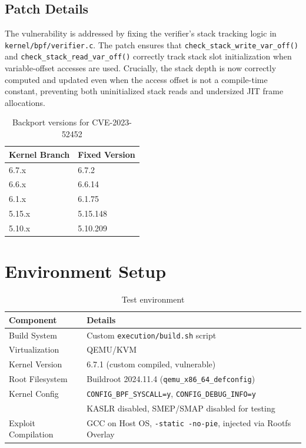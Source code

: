 \subsection{Patch Details}

The vulnerability is addressed by fixing the verifier's stack tracking logic in \texttt{kernel/bpf/verifier.c}. The patch ensures that \texttt{check\_stack\_write\_var\_off()} and \texttt{check\_stack\_read\_var\_off()} correctly track stack slot initialization when variable-offset accesses are used. Crucially, the stack depth is now correctly computed and updated even when the access offset is not a compile-time constant, preventing both uninitialized stack reads and undersized JIT frame allocations.

\begin{table}[H]
\centering
\begin{tabular}{@{}ll@{}}
\toprule
\textbf{Kernel Branch} & \textbf{Fixed Version} \\
\midrule
6.7.x & 6.7.2 \\
6.6.x & 6.6.14 \\
6.1.x & 6.1.75 \\
5.15.x & 5.15.148 \\
5.10.x & 5.10.209 \\
\bottomrule
\end{tabular}
\caption{Backport versions for CVE-2023-52452}
\end{table}


\section{Environment Setup}

\begin{table}[H]
\centering
\begin{tabular}{@{}ll@{}}
\toprule
\textbf{Component} & \textbf{Details} \\
\midrule
Build System & Custom \texttt{execution/build.sh} script \\
Virtualization & QEMU/KVM \\
Kernel Version & 6.7.1 (custom compiled, vulnerable) \\
Root Filesystem & Buildroot 2024.11.4 (\texttt{qemu\_x86\_64\_defconfig}) \\
Kernel Config & \texttt{CONFIG\_BPF\_SYSCALL=y}, \texttt{CONFIG\_DEBUG\_INFO=y} \\
              & KASLR disabled, SMEP/SMAP disabled for testing \\
Exploit Compilation & GCC on Host OS, \texttt{-static -no-pie}, injected via Rootfs Overlay \\
\bottomrule
\end{tabular}
\caption{Test environment}
\end{table}


